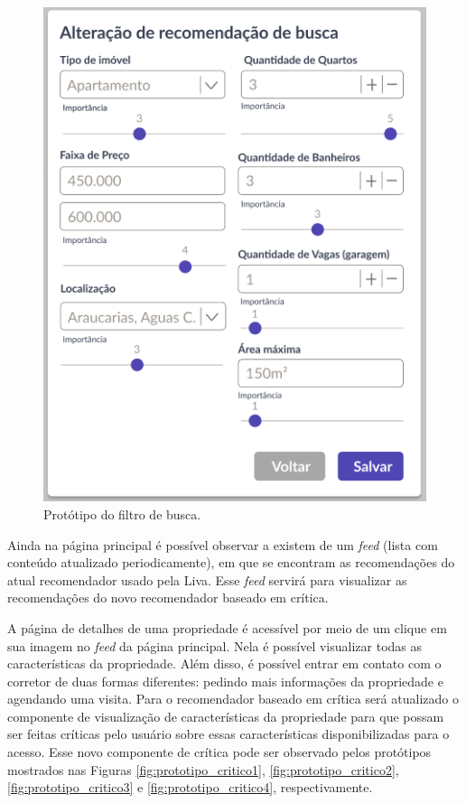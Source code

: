 \begin{figure}[H]
    \centering
    \includegraphics[scale=0.6]{figuras/proposta/prototipo_search_profile.jpg}
    \caption[Protótipo do filtro de busca]{Protótipo do filtro de busca.}
    \label{fig:prototipo_search_profile}
\end{figure}

Ainda na página principal é possível observar a existem de um \textit{feed} (lista com conteúdo atualizado periodicamente), em que se encontram as recomendações do atual recomendador usado pela Liva. Esse \textit{feed} servirá para visualizar as recomendações do novo recomendador baseado em crítica.

A página de detalhes de uma propriedade é acessível por meio de um clique em sua imagem no \textit{feed} da página principal. Nela é possível visualizar todas as características da propriedade. Além disso, é possível entrar em contato com o corretor de duas formas diferentes: pedindo mais informações da propriedade e agendando uma visita. Para o recomendador baseado em crítica será atualizado o componente de visualização de características da propriedade para que possam ser feitas críticas pelo usuário sobre essas características disponibilizadas para o acesso. Esse novo componente de crítica pode ser observado pelos protótipos mostrados nas Figuras \ref{fig:prototipo_critico1}, \ref{fig:prototipo_critico2}, \ref{fig:prototipo_critico3} e \ref{fig:prototipo_critico4}, respectivamente.

